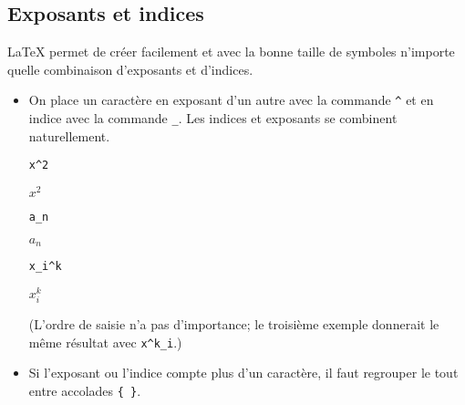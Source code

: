 \subsection{Exposants et indices}
\label{sec:math:bases:exposants}

{\LaTeX} permet de créer facilement et avec la bonne taille de
symboles n'importe quelle combinaison d'exposants et d'indices.

\begin{itemize}
\item On place un caractère en exposant d'un autre avec la commande
  \verb=^= et en indice avec la commande \verb=_=. Les indices et
  exposants se combinent naturellement.
  \begin{demo}
    \begin{minipage}{0.3\linewidth}
      \begin{texample}[0.6\linewidth]
\begin{lstlisting}
x^2
\end{lstlisting}
        \producing $x^2$
      \end{texample}
    \end{minipage}
    \quad
    \begin{minipage}{0.3\linewidth}
      \begin{texample}[0.6\linewidth]
\begin{lstlisting}
a_n
\end{lstlisting}
        \producing
        $a_n$
      \end{texample}
    \end{minipage}
    \quad
    \begin{minipage}{0.3\linewidth}
      \begin{texample}[0.63\linewidth]
\begin{lstlisting}
x_i^k
\end{lstlisting}
        \producing
        $x_i^k$
      \end{texample}
    \end{minipage}
  \end{demo}
  (L'ordre de saisie n'a pas d'importance; le troisième exemple
  donnerait le même résultat avec \verb=x^k_i=.)
\item Si l'exposant ou l'indice compte plus d'un caractère, il faut
  regrouper le tout entre accolades \verb={ }=.
  \begin{demo}
    \begin{minipage}{0.3\linewidth}
      \begin{texample}[0.6\linewidth]
\begin{lstlisting}

\end{lstlisting}
\end{texample}
\end{minipage}
\end{demo}
\end{itemize}
